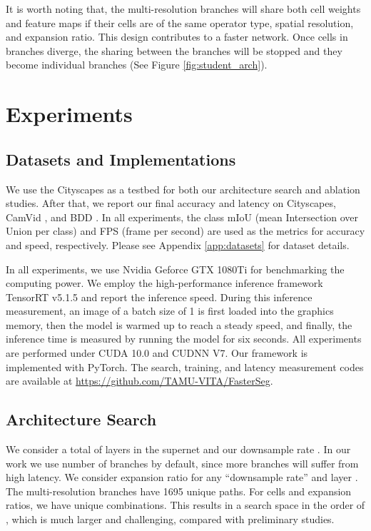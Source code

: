 \documentclass{article} \usepackage{iclr2020_conference,times}
\begin{document}
It is worth noting that, the multi-resolution branches will share both cell weights and feature maps if their cells are of the same operator type, spatial resolution, and expansion ratio. This design contributes to a faster network. Once cells in branches diverge, the sharing between the branches will be stopped and they become individual branches (See Figure \ref{fig:student_arch}).


\section{Experiments}\vspace{-0.5em}

\subsection{Datasets and Implementations}\vspace{-0.5em}

We use the Cityscapes \citep{cordts2016cityscapes} as a testbed for both our architecture search and ablation studies. After that, we report our final accuracy and latency on Cityscapes, CamVid \citep{brostow2008segmentation}, and BDD \citep{yu2018bdd100k}. In all experiments, the class mIoU (mean Intersection over Union per class) and FPS (frame per second) are used as the metrics for accuracy and speed, respectively. Please see Appendix \ref{app:datasets} for dataset details.

In all experiments, we use Nvidia Geforce GTX 1080Ti for benchmarking the computing power. We employ the high-performance inference framework TensorRT v5.1.5 and report the inference speed. During this inference measurement, an image of a batch size of 1 is first loaded into the graphics memory, then the model is warmed up to reach a steady speed, and finally, the inference time is measured by running the model for six seconds. All experiments are performed under CUDA 10.0 and CUDNN V7. Our framework is implemented with PyTorch. The search, training, and latency measurement codes are available at \url{https://github.com/TAMU-VITA/FasterSeg}.\vspace{-0.5em}

\subsection{Architecture Search}\vspace{-0.5em}

We consider a total of  layers in the supernet and our downsample rate . In our work we use number of branches  by default, since more branches will suffer from high latency. We consider expansion ratio  for any ``downsample rate''  and layer . The multi-resolution branches have 1695 unique paths. For cells and expansion ratios, we have  unique combinations. This results in a search space in the order of , which is much larger and challenging, compared with preliminary studies.
\end{document}
